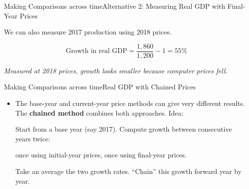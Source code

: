 \documentclass[10pt,aspectratio=169]{beamer}
\begin{document}
\begin{frame}{Making Comparisons across time}{Alternative 2: Measuring Real GDP with Final-Year Prices}

We can also measure 2017 production using 2018 prices.

\begin{table}
\end{table}


\[
\text{Growth in real GDP} = \frac{1,860}{1,200} - 1 = 55\%
\]

\begin{center}
\textit{Measured at 2018 prices, growth looks smaller because computer prices fell.}
\end{center}

\end{frame}


\begin{frame}{Making Comparisons across time}{Real GDP with Chained Prices}

\begin{itemize}
    \item The base-year and current-year price methods can give very different results. 
    \itemvso The \textbf{chained method} combines both approaches.
    \itemvso Idea:
    \begin{enumerate}
        \itemvso Start from a base year (say 2017).
        \itemvso Compute growth between consecutive years twice:
        \begin{itemize}
            \itemvso once using initial-year prices,
            \itemvso once using final-year prices.
        \end{itemize}
        \itemvso Take an average the two growth rates.
        \itemvso ``Chain'' this growth forward year by year.
    \end{enumerate}
\end{itemize}

\bigskip
\centering
{}


\end{frame}
\end{document}
